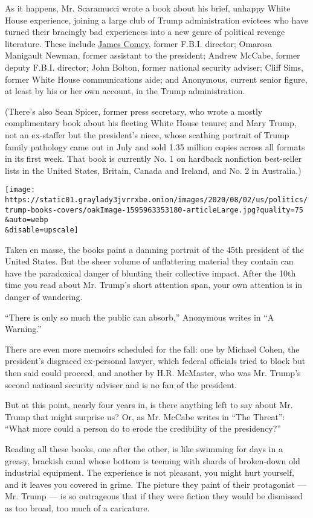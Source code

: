 As it happens, Mr. Scaramucci wrote a book about his brief, unhappy
White House experience, joining a large club of Trump administration
evictees who have turned their bracingly bad experiences into a new
genre of political revenge literature. These include
\href{https://www.nytimes3xbfgragh.onion/2019/10/12/us/politics/james-comey-trump.html}{James
Comey}, former F.B.I. director; Omarosa Manigault Newman, former
assistant to the president; Andrew McCabe, former deputy F.B.I.
director; John Bolton, former national security adviser; Cliff Sims,
former White House communications aide; and Anonymous, current senior
figure, at least by his or her own account, in the Trump administration.

(There's also Sean Spicer, former press secretary, who wrote a mostly
complimentary book about his fleeting White House tenure; and Mary
Trump, not an ex-staffer but the president's niece, whose scathing
portrait of Trump family pathology came out in July and sold 1.35
million copies across all formats in its first week. That book is
currently No. 1 on hardback nonfiction best-seller lists in the United
States, Britain, Canada and Ireland, and No. 2 in Australia.)

\texttt{[image: https://static01.graylady3jvrrxbe.onion/images/2020/08/02/us/politics/trump-books-covers/oakImage-1595963353180-articleLarge.jpg?quality=75\\\&auto=webp\\\&disable=upscale]}

Taken en masse, the books paint a damning portrait of the 45th president
of the United States. But the sheer volume of unflattering material they
contain can have the paradoxical danger of blunting their collective
impact. After the 10th time you read about Mr. Trump's short attention
span, your own attention is in danger of wandering.

``There is only so much the public can absorb,'' Anonymous writes in ``A
Warning.''

There are even more memoirs scheduled for the fall: one by Michael
Cohen, the president's disgraced ex-personal lawyer, which federal
officials tried to block but then said could proceed, and another by
H.R. McMaster, who was Mr. Trump's second national security adviser and
is no fan of the president.

But at this point, nearly four years in, is there anything left to say
about Mr. Trump that might surprise us? Or, as Mr. McCabe writes in
``The Threat'': ``What more could a person do to erode the credibility
of the presidency?''

Reading all these books, one after the other, is like swimming for days
in a greasy, brackish canal whose bottom is teeming with shards of
broken-down old industrial equipment. The experience is not pleasant,
you might hurt yourself, and it leaves you covered in grime. The picture
they paint of their protagonist --- Mr. Trump --- is so outrageous that
if they were fiction they would be dismissed as too broad, too much of a
caricature.

